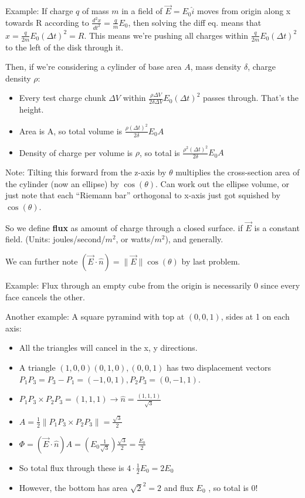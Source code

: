 \documentclass[11pt, oneside]{article}   	%
\begin{document}
Example: If charge $q$ of mass $m$ in a field of $\vec{E} = E_0\hat{i}$ moves from origin along x towards R according to $\frac{d^2x}{dt^2} = \frac{q}{m}E_0$, then solving the diff eq. means that $x = \frac{q}{2m}E_0(\Delta t)^2 = R$.  This means we're pushing all charges within $ \frac{q}{2m}E_0(\Delta t)^2$ to the left of the disk through it.

Then, if we're considering a cylinder of base area $A$, mass density $\delta$, charge density $\rho$:
\begin{itemize}
\item Every test charge chunk $\Delta V$ within $\frac{\rho \Delta V}{2 \delta \Delta V}E_0(\Delta t)^2$ passes through.  That's the height.
\item Area is A, so total volume is  $\frac{\rho (\Delta t)^2}{2 \delta}E_0A$
\item Density of charge per volume is $\rho$, so total is $\frac{\rho^2 (\Delta t)^2}{2 \delta}E_0A$
\end{itemize}

Note: Tilting this forward from the z-axis by $\theta$ multiplies the cross-section area of the cylinder (now an ellipse) by $\cos (\theta)$.  Can work out the ellipse volume, or just note that each ``Riemann bar'' orthogonal to x-axis just got squished by  $\cos (\theta)$. 

So we define \textbf{flux} as amount of charge through a closed surface.   if $\vec{E}$ is a constant field.  (Units: joules/second/$m^2$, or watts/$m^2$), and  generally.

We can further note $(\vec{E} \cdot \hat{n}) = \|\vec{E}\| \cos(\theta)$ by last problem.

Example: Flux through an empty cube from the origin is necessarily 0 since every face cancels the other.

Another example: A square pyramind with top at $(0,0,1)$, sides at 1 on each axis:
\begin{itemize}
\item All the triangles will cancel in the x, y directions.
\item A triangle $(1, 0 ,0) (0, 1, 0), (0, 0, 1)$ has two displacement vectors $P_1P_3 = P_3 - P_1 = (-1, 0, 1), P_2P_3 = (0, -1 , 1)$.
\item $P_1P_3 \times P_2P_3 = (1, 1, 1) \rightarrow \hat{n} = \frac{(1, 1, 1) }{\sqrt{3}}$
\item $A = \frac{1}{2} \| P_1P_3 \times P_2P_3 \| = \frac{\sqrt{3}}{2}$
\item $\Phi = (\vec{E} \cdot \hat{n}) A = (E_0 \frac{1}{\sqrt{3}}) \frac{\sqrt{3}}{2} = \frac{E_0}{2}$
\item So total flux through these is $4 \cdot \frac{1}{2} E_0 = 2E_0$
\item However, the bottom has area $\sqrt{2}^2 = 2$ and flux $E_0$ , so total is 0!
\end{itemize}
\end{document}
